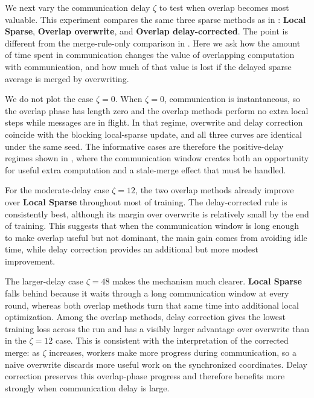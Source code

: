 \documentclass{article}
\theoremstyle{plain}
\theoremstyle{definition}
\begin{document}
We next vary the communication delay $\zeta$ to test when overlap becomes most valuable.
This experiment compares the same three sparse methods as in : \textbf{Local Sparse}, \textbf{Overlap overwrite}, and \textbf{Overlap delay-corrected}.
The point is different from the merge-rule-only comparison in .
Here we ask how the amount of time spent in communication changes the value of overlapping computation with communication, and how much of that value is lost if the delayed sparse average is merged by overwriting.

We do not plot the case $\zeta=0$.
When $\zeta=0$, communication is instantaneous, so the overlap phase has length zero and the overlap methods perform no extra local steps while messages are in flight.
In that regime, overwrite and delay correction coincide with the blocking local-sparse update, and all three curves are identical under the same seed.
The informative cases are therefore the positive-delay regimes shown in , where the communication window creates both an opportunity for useful extra computation and a stale-merge effect that must be handled.

For the moderate-delay case $\zeta=12$, the two overlap methods already improve over \textbf{Local Sparse} throughout most of training.
The delay-corrected rule is consistently best, although its margin over overwrite is relatively small by the end of training.
This suggests that when the communication window is long enough to make overlap useful but not dominant, the main gain comes from avoiding idle time, while delay correction provides an additional but more modest improvement.

The larger-delay case $\zeta=48$ makes the mechanism much clearer.
\textbf{Local Sparse} falls behind because it waits through a long communication window at every round, whereas both overlap methods turn that same time into additional local optimization.
Among the overlap methods, delay correction gives the lowest training loss across the run and has a visibly larger advantage over overwrite than in the $\zeta=12$ case.
This is consistent with the interpretation of the corrected merge: as $\zeta$ increases, workers make more progress during communication, so a naive overwrite discards more useful work on the synchronized coordinates.
Delay correction preserves this overlap-phase progress and therefore benefits more strongly when communication delay is large.
\end{document}
